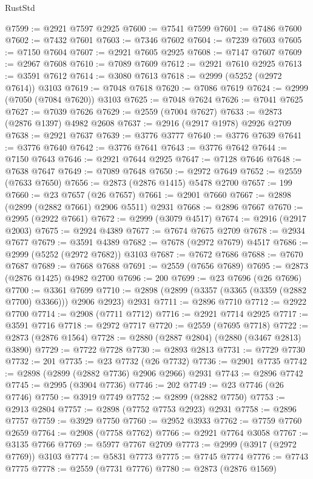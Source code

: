 \begin{lexlean}{RustStd}
\begin{coremodule}
@7599 := @2921 @7597 @2925
@7600 := @7541 @7599
@7601 := @7486 @7600
@7602 := @7432 @7601
@7603 := @7346 @7602
@7604 := @7239 @7603
@7605 := @7150 @7604
@7607 := @2921 @7605 @2925
@7608 := @7147 @7607
@7609 := @2967 @7608
@7610 := @7089 @7609
@7612 := @2921 @7610 @2925
@7613 := @3591 @7612
@7614 := @3080 @7613
@7618 := @2999 (@5252 (@2972 @7614)) @3103
@7619 := @7048 @7618
@7620 := @7086 @7619
@7624 := @2999 (@7050 (@7084 @7620)) @3103
@7625 := @7048 @7624
@7626 := @7041 @7625
@7627 := @7039 @7626
@7629 := @2559 (@7004 @7627)
@7633 := @2873 (@2876 @1397) @4982 @2608
@7637 := @2916 (@2917 @1978) @2926 @2709
@7638 := @2921 @7637
@7639 := @3776 @3777
@7640 := @3776 @7639
@7641 := @3776 @7640
@7642 := @3776 @7641
@7643 := @3776 @7642
@7644 := @7150 @7643
@7646 := @2921 @7644 @2925
@7647 := @7128 @7646
@7648 := @7638 @7647
@7649 := @7089 @7648
@7650 := @2972 @7649
@7652 := @2559 (@7633 @7650)
@7656 := @2873 (@2876 @1415) @5478 @2700
@7657 := 199
@7660 := @23 @7657 (@26 @7657)
@7661 := @2901 @7660
@7667 := @2898 (@2899 (@2882 @7661) @2906 @5511) @2931
@7668 := @2896 @7667
@7670 := @2995 (@2922 @7661)
@7672 := @2999 (@3079 @4517)
@7674 := @2916 (@2917 @2003)
@7675 := @2924 @4389
@7677 := @7674 @7675 @2709
@7678 := @2934 @7677
@7679 := @3591 @4389
@7682 := @7678 (@2972 @7679) @4517
@7686 := @2999 (@5252 (@2972 @7682)) @3103
@7687 := @7672 @7686
@7688 := @7670 @7687
@7689 := @7668 @7688
@7691 := @2559 (@7656 @7689)
@7695 := @2873 (@2876 @1425) @4982 @2700
@7696 := 200
@7699 := @23 @7696 (@26 @7696)
@7700 := @3361 @7699
@7710 := @2898 (@2899 (@3357 (@3365 (@3359 (@2882 @7700) @3366))) @2906 @2923) @2931
@7711 := @2896 @7710
@7712 := @2922 @7700
@7714 := @2908 (@7711 @7712)
@7716 := @2921 @7714 @2925
@7717 := @3591 @7716
@7718 := @2972 @7717
@7720 := @2559 (@7695 @7718)
@7722 := @2873 (@2876 @1564)
@7728 := @2880 (@2887 @2804) (@2880 (@3467 @2813) @3890)
@7729 := @7722 @7728
@7730 := @2893 @2813
@7731 := @7729 @7730
@7732 := 201
@7735 := @23 @7732 (@26 @7732)
@7736 := @2901 @7735
@7742 := @2898 (@2899 (@2882 @7736) @2906 @2966) @2931
@7743 := @2896 @7742
@7745 := @2995 (@3904 @7736)
@7746 := 202
@7749 := @23 @7746 (@26 @7746)
@7750 := @3919 @7749
@7752 := @2899 (@2882 @7750)
@7753 := @2913 @2804
@7757 := @2898 (@7752 @7753 @2923) @2931
@7758 := @2896 @7757
@7759 := @3929 @7750
@7760 := @2952 @3933
@7762 := @7759 @7760 @2659
@7764 := @2908 (@7758 @7762)
@7766 := @2921 @7764 @3058
@7767 := @3135 @7766
@7769 := @5977 @7767 @2709
@7773 := @2999 (@3917 (@2972 @7769)) @3103
@7774 := @5831 @7773
@7775 := @7745 @7774
@7776 := @7743 @7775
@7778 := @2559 (@7731 @7776)
@7780 := @2873 (@2876 @1569)

\end{coremodule}
\end{lexlean}
